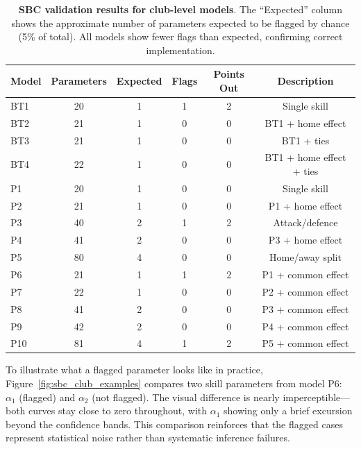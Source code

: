 \begin{table}[htbp]
    \centering
    \begin{tabular}{lccccc}
        \toprule
        Model & Parameters & Expected & Flags & Points Out & Description \\
        \midrule
        BT1 & 20 & 1 & 1 & 2 & Single skill \\
        BT2 & 21 & 1 & 0 & 0 & BT1 + home effect \\
        BT3 & 21 & 1 & 0 & 0 & BT1 + ties \\
        BT4 & 22 & 1 & 0 & 0 & BT1 + home effect + ties \\
        \midrule
        P1  & 20 & 1 & 0 & 0 & Single skill \\
        P2  & 21 & 1 & 0 & 0 & P1 + home effect \\
        P3  & 40 & 2 & 1 & 2 & Attack/defence \\
        P4  & 41 & 2 & 0 & 0 & P3 + home effect \\
        P5  & 80 & 4 & 0 & 0 & Home/away split \\
        P6  & 21 & 1 & 1 & 2 & P1 + common effect \\
        P7  & 22 & 1 & 0 & 0 & P2 + common effect \\
        P8  & 41 & 2 & 0 & 0 & P3 + common effect \\
        P9  & 42 & 2 & 0 & 0 & P4 + common effect \\
        P10 & 81 & 4 & 1 & 2 & P5 + common effect \\
        \bottomrule
    \end{tabular}
    \caption{
        \textbf{SBC validation results for club-level models}.
        The ``Expected'' column shows the approximate number of parameters expected to be flagged by chance (5\% of total).
        All models show fewer flags than expected, confirming correct implementation.
    }
    \label{tab:sbc_club_level}
\end{table}

To illustrate what a flagged parameter looks like in practice, Figure~\ref{fig:sbc_club_examples} compares two skill parameters from model P6: $\alpha_1$ (flagged) and $\alpha_2$ (not flagged).
The visual difference is nearly imperceptible—both curves stay close to zero throughout, with $\alpha_1$ showing only a brief excursion beyond the confidence bands.
This comparison reinforces that the flagged cases represent statistical noise rather than systematic inference failures.

